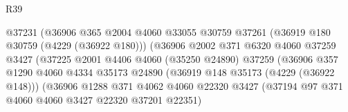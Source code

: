\begin{lexlean}{R39}
\begin{coremodule}
                                          @37231
                                          (@36906
                                            @365
                                            @2004
                                            @4060
                                            @33055
                                            @30759
                                            @37261
                                            (@36919 @180 @30759 (@4229 (@36922 @180)))
                                            (@36906
                                              @2002
                                              @371
                                              @6320
                                              @4060
                                              @37259
                                              @3427
                                              (@37225
                                                @2001
                                                @4406
                                                @4060
                                                (@35250 @24890)
                                                @37259
                                                (@36906
                                                  @357
                                                  @1290
                                                  @4060
                                                  @4334
                                                  @35173
                                                  @24890
                                                  (@36919 @148 @35173 (@4229 (@36922 @148)))
                                                  (@36906
                                                    @1288
                                                    @371
                                                    @4062
                                                    @4060
                                                    @22320
                                                    @3427
                                                    (@37194
                                                      @97
                                                      @371
                                                      @4060
                                                      @4060
                                                      @3427
                                                      @22320
                                                      @37201
                                                      @22351)

\end{coremodule}
\end{lexlean}
